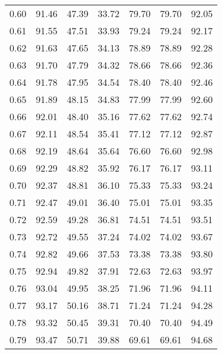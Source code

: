 \begin{tabular}{|c|c|c|c|c|c|c|}
      0.60 &     91.46 &     47.39 &      33.72 &   79.70 &      79.70 &         92.05 \\
      0.61 &     91.55 &     47.51 &      33.93 &   79.24 &      79.24 &         92.17 \\
      0.62 &     91.63 &     47.65 &      34.13 &   78.89 &      78.89 &         92.28 \\
      0.63 &     91.70 &     47.79 &      34.32 &   78.66 &      78.66 &         92.36 \\
      0.64 &     91.78 &     47.95 &      34.54 &   78.40 &      78.40 &         92.46 \\
      0.65 &     91.89 &     48.15 &      34.83 &   77.99 &      77.99 &         92.60 \\
      0.66 &     92.01 &     48.40 &      35.16 &   77.62 &      77.62 &         92.74 \\
      0.67 &     92.11 &     48.54 &      35.41 &   77.12 &      77.12 &         92.87 \\
      0.68 &     92.19 &     48.64 &      35.64 &   76.60 &      76.60 &         92.98 \\
      0.69 &     92.29 &     48.82 &      35.92 &   76.17 &      76.17 &         93.11 \\
      0.70 &     92.37 &     48.81 &      36.10 &   75.33 &      75.33 &         93.24 \\
      0.71 &     92.47 &     49.01 &      36.40 &   75.01 &      75.01 &         93.35 \\
      0.72 &     92.59 &     49.28 &      36.81 &   74.51 &      74.51 &         93.51 \\
      0.73 &     92.72 &     49.55 &      37.24 &   74.02 &      74.02 &         93.67 \\
      0.74 &     92.82 &     49.66 &      37.53 &   73.38 &      73.38 &         93.80 \\
      0.75 &     92.94 &     49.82 &      37.91 &   72.63 &      72.63 &         93.97 \\
      0.76 &     93.04 &     49.95 &      38.25 &   71.96 &      71.96 &         94.11 \\
      0.77 &     93.17 &     50.16 &      38.71 &   71.24 &      71.24 &         94.28 \\
      0.78 &     93.32 &     50.45 &      39.31 &   70.40 &      70.40 &         94.49 \\
      0.79 &     93.47 &     50.71 &      39.88 &   69.61 &      69.61 &         94.68 \\

\end{tabular}
